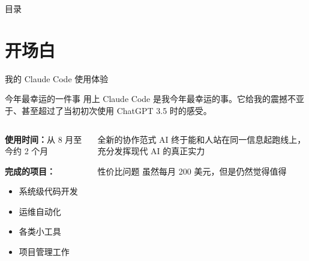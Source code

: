 \documentclass[aspectratio=169,xcolor=dvipsnames]{beamer}
\begin{document}
\begin{frame}[plain]
  \titlepage
\end{frame}

\begin{frame}[plain]{目录}
  \tableofcontents
\end{frame}

\section{开场白}

\begin{frame}{我的 Claude Code 使用体验}
  \begin{block}{今年最幸运的一件事}
    用上 Claude Code 是我今年最幸运的事。它给我的震撼不亚于、甚至超过了当初初次使用 ChatGPT 3.5 时的感受。
  \end{block}

  \vspace{0.3cm}

  \begin{columns}
    \begin{column}{0.48\textwidth}
      \textbf{使用时间：}从 8 月至今约 2 个月

      \vspace{0.3cm}

      \textbf{完成的项目：}
      \begin{itemize}
        \item 系统级代码开发
        \item 运维自动化
        \item 各类小工具
        \item 项目管理工作
      \end{itemize}
    \end{column}
    \begin{column}{0.48\textwidth}
      \begin{exampleblock}{全新的协作范式}
        AI 终于能和人站在同一信息起跑线上，充分发挥现代 AI 的真正实力
      \end{exampleblock}

      \vspace{0.3cm}

      \begin{alertblock}{性价比问题}
        虽然每月 200 美元，但是仍然觉得值得
      \end{alertblock}
    \end{column}
  \end{columns}
\end{frame}
\end{document}

